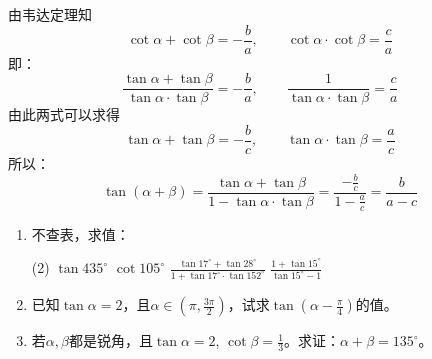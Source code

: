 \begin{solution}
由韦达定理知
\[\cot\alpha+\cot\beta=-\frac{b}{a},\qquad \cot\alpha\cdot \cot\beta=\frac{c}{a}\]    
即：
\[\frac{\tan\alpha+\tan\beta}{\tan\alpha\cdot \tan\beta}=-\frac{b}{a},\qquad \frac{1}{\tan\alpha\cdot \tan\beta}=\frac{c}{a}\]  
由此两式可以求得 
\[\tan\alpha+\tan\beta=-\frac{b}{c},\qquad \tan\alpha\cdot \tan\beta=\frac{a}{c}\]
所以：
\[\tan(\alpha+\beta)=\frac{\tan\alpha+\tan\beta}{1-\tan\alpha\cdot \tan\beta}=\frac{-\frac{b}{c}}{1-\frac{a}{c}}=\frac{b}{a-c}\]
\end{solution}

\begin{ex}
\begin{enumerate}
    \item 不查表，求值：
\begin{tasks}(2)
    \task $\tan 435^{\circ}$
    \task $\cot 105^{\circ}$
    \task $\frac{\tan 17^{\circ}+\tan 28^{\circ}}{1+\tan 17^{\circ}\cdot \tan 152^{\circ}}$
    \task $\frac{1+\tan 15^{\circ}}{\tan 15^{\circ}-1}$
\end{tasks}

\item 已知$\tan\alpha=2$，且$\alpha\in\left(\pi,\frac{3\pi}{2}\right)$，试求$\tan\left(\alpha-\frac{\pi}{4}\right)$的值。
\item 若$\alpha,\beta$都是锐角，且$\tan\alpha=2$, $\cot\beta=\frac{1}{3}$。求证：$\alpha+\beta =135^{\circ}$。
\end{enumerate} 
\end{ex}

